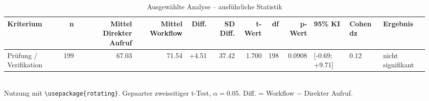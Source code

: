 \begin{table}
\centering
\caption{Ausgewählte Analyse -- ausführliche Statistik}
\begin{tabular}{lrrrrrrrrlll}
\toprule
Kriterium & n & Mittel Direkter Aufruf & Mittel Workflow & Diff. & SD Diff. & t-Wert & df & p-Wert & 95\% KI & Cohen dz & Ergebnis \\
\midrule
Prüfung / Verifikation & 199 & 67.03 & 71.54 & +4.51 & 37.42 & 1.700 & 198 & 0.0908 & [-0.69; +9.71] & 0.12 & nicht signifikant \\
\bottomrule
\end{tabular}
\\[2mm]
\footnotesize Nutzung mit \texttt{\textbackslash usepackage\{rotating\}}. Gepaarter zweiseitiger t-Test, $\alpha=0.05$. Diff. = Workflow $-$ Direkter Aufruf.
\end{table}

